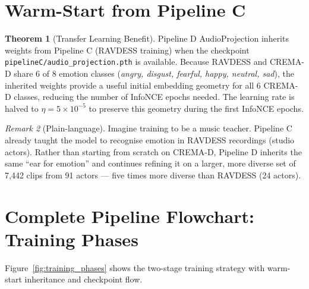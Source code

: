 \documentclass[12pt,a4paper]{article}
\theoremstyle{definition}
\newtheorem{theorem}{Theorem}[section]
\theoremstyle{remark}
\newtheorem{remark}[theorem]{Remark}
\begin{document}
\section{Warm-Start from Pipeline C}

\begin{theorem}[Transfer Learning Benefit]
Pipeline D AudioProjection inherits weights from Pipeline C (RAVDESS training)
when the checkpoint \texttt{pipelineC/audio\_projection.pth} is available.
Because RAVDESS and CREMA-D share 6 of 8 emotion classes
(\textit{angry, disgust, fearful, happy, neutral, sad}),
the inherited weights provide a useful initial embedding geometry
for all 6 CREMA-D classes, reducing the number of InfoNCE epochs needed.
The learning rate is halved to $\eta = 5 \times 10^{-5}$ to preserve this geometry
during the first InfoNCE epochs.
\end{theorem}

\begin{remark}[Plain-language]
Imagine training to be a music teacher. Pipeline C already taught the model
to recognise emotion in RAVDESS recordings (studio actors). Rather than
starting from scratch on CREMA-D, Pipeline D inherits the same ``ear for emotion''
and continues refining it on a larger, more diverse set of 7,442 clips from 91
actors — five times more diverse than RAVDESS (24 actors).
\end{remark}

\section{Complete Pipeline Flowchart: Training Phases}

Figure~\ref{fig:training_phases} shows the two-stage training strategy
with warm-start inheritance and checkpoint flow.
\end{document}
